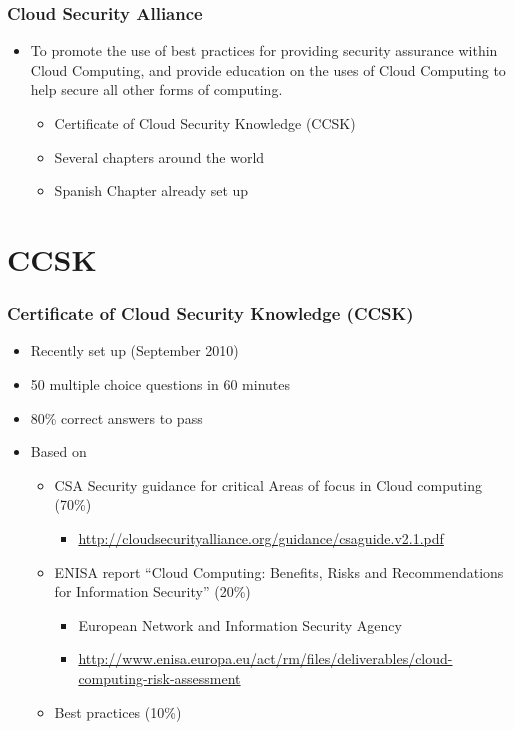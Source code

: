 \documentclass{beamer}
\begin{document}
\begin{frame}
\frametitle{Cloud Security Alliance}
\begin{itemize}
\item To promote the use of best practices for providing security assurance within Cloud Computing, and provide education on the uses of Cloud Computing to help secure all other forms of computing.
   \begin{itemize}
      \item Certificate of Cloud Security Knowledge (CCSK)
      \item Several chapters around the world
      \item Spanish Chapter already set up
   \end{itemize}
\end{itemize}
\end{frame}


\section{CCSK}

\begin{frame}
 \frametitle{Certificate of Cloud Security Knowledge (CCSK)}
 \begin{itemize}
 \item Recently set up (September 2010)
 \item 50 multiple choice questions in 60 minutes
 \item 80\% correct answers to pass
 \item Based on
    \begin{itemize}
    \item CSA Security guidance for critical Areas of focus in Cloud computing (70\%)
        \begin{itemize}
        \item \url{http://cloudsecurityalliance.org/guidance/csaguide.v2.1.pdf}
        \end{itemize}
    \item ENISA report “Cloud Computing: Benefits, Risks and Recommendations for Information Security” (20\%)
       \begin{itemize}
       \item European Network and Information Security Agency
       \item \url{http://www.enisa.europa.eu/act/rm/files/deliverables/cloud-computing-risk-assessment}
       \end{itemize}
    \item Best practices (10\%)
    \end{itemize}
 \end{itemize}
\end{frame}
\end{document}
